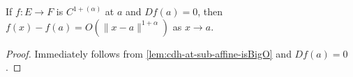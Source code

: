 \begin{corollary}%
  \label{cor:cdh-at-sub-isBigO}
  If \(f\colon E \to F\) is \(C^{1+(\alpha)}\) at \(a\) and \(Df(a) = 0\),
  then \(f(x) - f(a) = O\left(\|x - a\|^{1 + \alpha}\right)\) as \(x \to a\).
\end{corollary}

\begin{proof}
  Immediately follows from \autoref{lem:cdh-at-sub-affine-isBigO} and \(Df(a) = 0\).
\end{proof}


